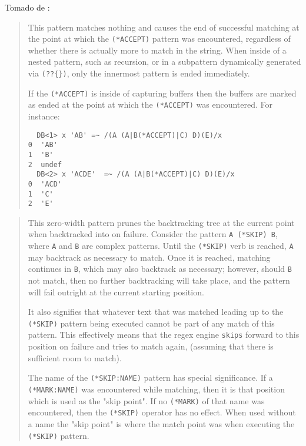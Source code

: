 
Tomado de :

\begin{it}
\begin{quotation}
This pattern matches nothing and causes the end of successful matching
at the point at which the \verb#(*ACCEPT)# pattern was encountered, regardless
of whether there is actually more to match in the string. When inside
of a nested pattern, such as recursion, or in a subpattern dynamically
generated via \verb#(??{})#, only the innermost pattern is ended immediately.

If the \verb#(*ACCEPT)# is inside of capturing buffers then the buffers are
marked as ended at the point at which the \verb#(*ACCEPT)# was encountered. For
instance:

\begin{verbatim}
  DB<1> x 'AB' =~ /(A (A|B(*ACCEPT)|C) D)(E)/x
0  'AB'
1  'B'
2  undef
  DB<2> x 'ACDE'  =~ /(A (A|B(*ACCEPT)|C) D)(E)/x
0  'ACD'
1  'C'
2  'E'
\end{verbatim}

\end{quotation}
\end{it}


\begin{it}
\begin{quotation}
This zero-width pattern 
prunes the backtracking tree at the current point
when backtracked into on failure. Consider the pattern \verb|A (*SKIP) B|,
where \verb|A| and \verb|B| are complex patterns. Until the \verb|(*SKIP)| verb is reached,
\verb|A| may backtrack as necessary to match. Once it is reached, matching
continues in \verb|B|, which may also backtrack as necessary; however, should \verb|B|
not match, then no further backtracking will take place, and the pattern
will fail outright at the current starting position.

It also signifies that whatever text that was matched leading up to the
\verb|(*SKIP)|  pattern being executed cannot be part of any match of this
pattern. This effectively means that the regex engine \verb"skips" forward
to this position on failure and tries to match again, (assuming that
there is sufficient room to match).

The name of the \verb|(*SKIP:NAME)| pattern has special significance. If a
\verb|(*MARK:NAME)| was encountered while matching, then it is that position
which is used as the "skip point". If no \verb|(*MARK)| of that name was
encountered, then the \verb|(*SKIP)| operator has no effect. When used without
a name the "skip point" is where the match point was when executing the
\verb|(*SKIP)| pattern.
\end{quotation}
\end{it}

